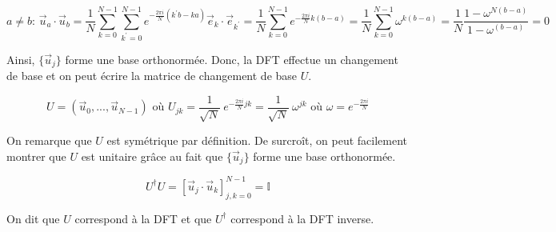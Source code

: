\begin{equation*}
    a \neq b \text{: \ } \Vec{u}_a \cdot \Vec{u}_b = \frac{1}{N} \sum_{k=0}^{N-1}\sum_{k^{'} = 0}^{N-1} e^{-\frac{2\pi i}{N}(k^{'}b - ka)}\Vec{e}_k \cdot \Vec{e}_{k^{'}} = \frac{1}{N}\sum_{k=0}^{N-1} e^{-\frac{2\pi i}{N}k (b-a)} = \frac{1}{N}\sum_{k=0}^{N-1} \omega ^{k(b-a)} = \frac{1}{N}\frac{1 -\omega^{N(b-a)}}{1-\omega^{(b-a)}} = 0
\end{equation*}

    Ainsi, $\{\Vec{u}_j\}$ forme une base orthonormée. Donc, la DFT effectue un changement de base et on peut écrire la matrice de changement de base $U$.

\begin{equation*}
    U = \left(\Vec{u}_0, ...,\Vec{u}_{N-1}\right) \text{\ où \ } U_{jk} = \frac{1}{\sqrt{N}} \ e^{-\frac{2\pi i}{N}jk} = \frac{1}{\sqrt{N}} \ \omega^{jk} \text{\ où \ } \omega = e^{-\frac{2\pi i}{N}} 
\end{equation*}

On remarque que $U$ est symétrique par définition.
 De surcroît, on peut facilement montrer que $U$ est unitaire grâce au fait que $\{\Vec{u}_j\}$ forme une base orthonormée.

\begin{equation*}
    U^\dag U = [\Vec{u}_j \cdot   \Vec{u}_k]_{j,k = 0}^{N-1} = \mathbb{I}
\end{equation*}

On dit que $U$ correspond à la DFT et que $U^{\dag}$ correspond à la DFT inverse.